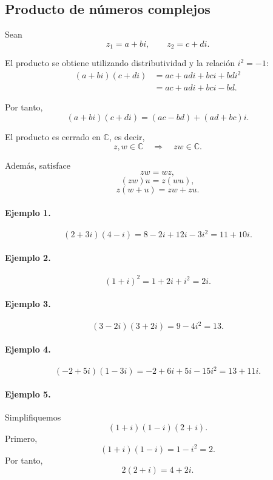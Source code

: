 \subsection{Producto de números complejos}

Sean
\[
z_1=a+bi,
\qquad
z_2=c+di.
\]

El producto se obtiene utilizando distributividad y la relación $i^2=-1$:
\begin{align*}
(a+bi)(c+di)
&=
ac+adi+bci+bdi^2\\
&=
ac+adi+bci-bd.
\end{align*}

Por tanto,
\[
\boxed{
(a+bi)(c+di)
=
(ac-bd)+(ad+bc)i.
}
\]

El producto es cerrado en $\mathbb{C}$, es decir,
\[
z,w\in\mathbb{C}
\quad\Longrightarrow\quad
zw\in\mathbb{C}.
\]

Además, satisface
\[
zw=wz,
\]
\[
(zw)u=z(wu),
\]
\[
z(w+u)=zw+zu.
\]

\paragraph{Ejemplo 1.}
\[
(2+3i)(4-i)
=
8-2i+12i-3i^2
=
\boxed{11+10i}.
\]

\paragraph{Ejemplo 2.}
\[
(1+i)^2
=
1+2i+i^2
=
\boxed{2i}.
\]

\paragraph{Ejemplo 3.}
\[
(3-2i)(3+2i)
=
9-4i^2
=
\boxed{13}.
\]

\paragraph{Ejemplo 4.}
\[
(-2+5i)(1-3i)
=
-2+6i+5i-15i^2
=
\boxed{13+11i}.
\]

\paragraph{Ejemplo 5.}
Simplifiquemos
\[
(1+i)(1-i)(2+i).
\]
Primero,
\[
(1+i)(1-i)=1-i^2=2.
\]
Por tanto,
\[
2(2+i)
=
\boxed{4+2i}.
\]

